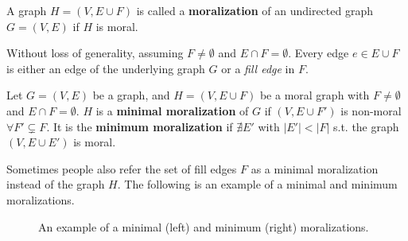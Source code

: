 \begin{definition}
A graph $H=(V,E\cup F)$ is called a \textbf{moralization} of an undirected graph $G=(V,E)$ if $H$ is moral. 
\end{definition}

Without loss of generality, assuming $F\neq \emptyset$ and $E\cap F=\emptyset$. Every edge $e\in E\cup F$ is either an edge of the underlying graph $G$ or a \textit{fill edge} in $F$. 

\begin{definition}
Let $G=(V,E)$ be a graph, and $H=(V,E\cup F)$ be a moral graph with $F\neq \emptyset$ and $E\cap F=\emptyset$. $H$ is a \textbf{minimal moralization} of $G$ if $(V,E\cup F')$ is non-moral $\forall F' \subsetneq F$. It is the \textbf{minimum moralization} if $\nexists E'$ with $|E'| < |F|$ s.t. the graph $(V,E\cup E')$ is moral. 
\end{definition}
Sometimes people also refer the set of fill edges $F$ as a minimal moralization instead of the graph $H$. The following is an  example of a minimal and minimum moralizations. 
\begin{figure}[H]
\centering
{}
\caption{An example of a minimal (left) and minimum (right) moralizations.}
\label{fg:mini_moral}
\end{figure}

